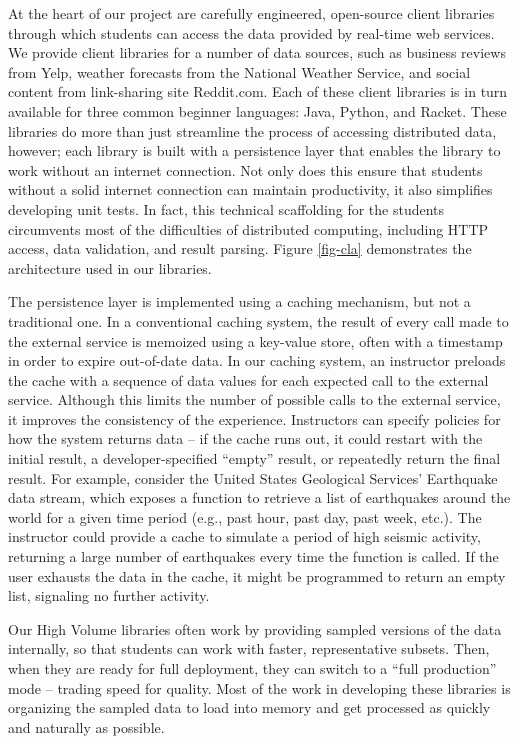 At the heart of our project are carefully engineered, open-source client libraries through which students can access the data provided by real-time web services.
We provide client libraries for a number of data sources, such as business reviews from Yelp, weather forecasts from the National Weather Service, and social content from link-sharing site Reddit.com.
Each of these client libraries is in turn available for three common beginner languages: Java, Python, and Racket. 
These libraries do more than just streamline the process of accessing distributed data, however; each library is built with a persistence layer that enables the library to work without an internet connection.
Not only does this ensure that students without a solid internet connection can maintain productivity, it also simplifies developing unit tests. 
In fact, this technical scaffolding for the students circumvents most of the difficulties of distributed computing, including HTTP access, data validation, and result parsing.
Figure \ref{fig-cla} demonstrates the architecture used in our libraries.

The persistence layer is implemented using a caching mechanism, but not a traditional one.
In a conventional caching system, the result of every call made to the external service is memoized using a key-value store, often with a timestamp in order to expire out-of-date data.
In our caching system, an instructor preloads the cache with a sequence of data values for each expected call to the external service.
Although this limits the number of possible calls to the external service, it improves the consistency of the experience.
Instructors can specify policies for how the system returns data -- if the cache runs out, it could restart with the initial result, a developer-specified ``empty'' result, or repeatedly return the final result.
For example, consider the United States Geological Services' Earthquake data stream, which exposes a function to retrieve a list of earthquakes around the world for a given time period (e.g., past hour, past day, past week, etc.). 
The instructor could provide a cache to simulate a period of high seismic activity, returning a large number of earthquakes every time the function is called.
If the user exhausts the data in the cache, it might be programmed to return an empty list, signaling no further activity.

Our High Volume libraries often work by providing sampled versions of the data internally, so that students can work with faster, representative subsets.
Then, when they are ready for full deployment, they can switch to a ``full production'' mode -- trading speed for quality. 
Most of the work in developing these libraries is organizing the sampled data to load into memory and get processed as quickly and naturally as possible.

